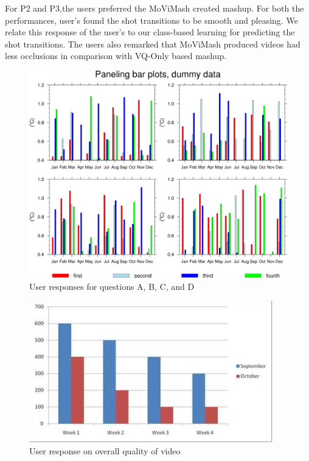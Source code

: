 \documentclass{sig-alternate}
\begin{document}
For P2 and P3,the users preferred the MoViMash created mashup. For both the performances, user’s found the shot transitions to be smooth and pleasing. We relate this response of the user’s to our class-based learning for predicting the shot transitions. The users also remarked that MoViMash produced videos had less occlusions in comparison with VQ-Only based mashup.

\begin{figure}[h!]
    \centering
    \includegraphics[width = \linewidth]{7.png}
    \caption{User responses for questions A, B, C, and D}
    \label{fig: 7}
\end{figure}

\begin{figure}[h!]
    \centering
    \includegraphics[width = \linewidth]{8.jpg}
    \caption{User response on overall quality of video}
    \label{fig: 8}
\end{figure}
\end{document}
